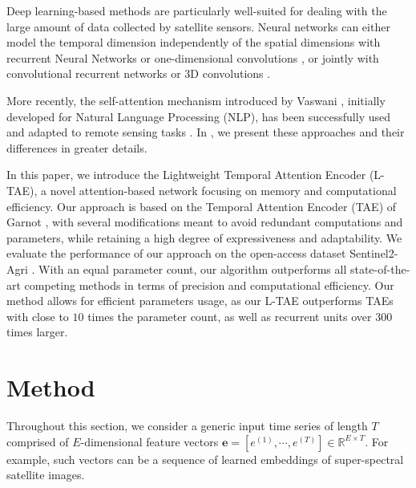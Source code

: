 \documentclass[runningheads]{llncs}
\begin{document}
Deep learning-based methods are particularly well-suited for dealing with the large amount of data collected by satellite sensors. Neural networks can either model the temporal dimension independently of the spatial dimensions with recurrent Neural Networks \cite{garnot2019time} or one-dimensional convolutions \cite{pelletier2019temporal}, or jointly with convolutional recurrent networks \cite{russwurm2018convolutional} or 3D convolutions \cite{ji20183d}.

More recently, the self-attention mechanism introduced by Vaswani \etal \cite{vaswani2017attention}, initially developed for Natural Language Processing (NLP), has been successfully used and adapted to remote sensing tasks \cite{russwurm2019self,garnot2019satellite}. In , we present these approaches and their differences in greater details.

 In this paper, we introduce the Lightweight Temporal Attention Encoder (L-TAE), a novel attention-based network focusing on memory and computational efficiency. Our approach is based on the Temporal Attention Encoder (TAE) of Garnot \etal \cite{garnot2019satellite}, with several modifications meant to avoid redundant computations and parameters, while retaining a high degree of expressiveness and adaptability.
We evaluate the performance of our approach on the open-access dataset Sentinel2-Agri \cite{garnot2019satellite}. With an equal parameter count, our algorithm outperforms all state-of-the-art competing methods in terms of precision and computational efficiency. Our method allows for efficient parameters usage, as our L-TAE outperforms TAEs with close to $10$ times the parameter count, as well as recurrent units over $300$ times larger.
 \section{Method}
Throughout this section, we consider a generic input time series of length $T$ comprised of $E$-dimensional feature vectors $\mathbf{e} = [e^{(1)}, \cdots, e^{(T)}] \in \mathbb{R}^{E \times T}$. For example, such vectors can be a sequence of learned embeddings of super-spectral satellite images. 
\end{document}
